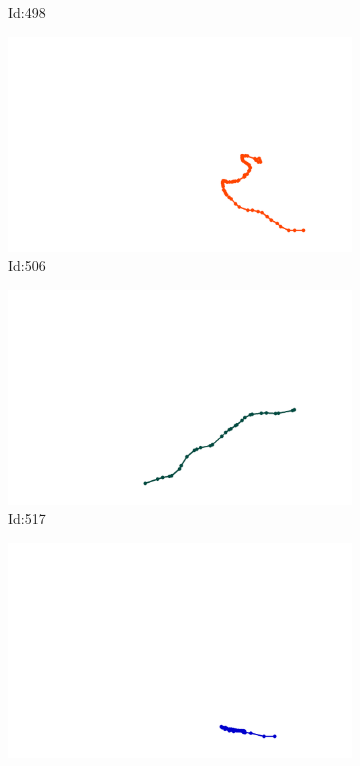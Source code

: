 \documentclass[12pt,twoside]{report}
\begin{document}
\begin{figure}
\begin{subfigure}[b]{0.20\textwidth}
\caption{Id:498}
\end{subfigure}
\begin{subfigure}[b]{0.20\textwidth}
\centering
\includegraphics[width=\textwidth]{../trajectories/506.png}
\caption{Id:506}
\end{subfigure}
\begin{subfigure}[b]{0.20\textwidth}
\centering
\includegraphics[width=\textwidth]{../trajectories/517.png}
\caption{Id:517}
\end{subfigure}
\begin{subfigure}[b]{0.20\textwidth}
\centering
\includegraphics[width=\textwidth]{../trajectories/539.png}

\end{subfigure}
\end{figure}
\end{document}
